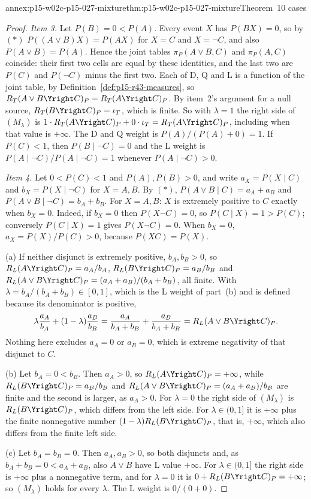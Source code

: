 \begin{annexitem}{annex:p15-w02c-p15-027-mixture}{thm:p15-w02c-p15-027-mixture}{Theorem~10 cases}
\begin{proof}
\emph{Item 3.} Let \(P(B)=0<P(A)\). Every event \(X\) has
\(P(BX)=0\), so by \((\ast)\) \(P((A\vee B)X)=P(AX)\) for \(X=C\) and
\(X=\neg C\), and also \(P(A\vee B)=P(A)\). Hence the joint tables
\(\pi_P(A\vee B,C)\) and \(\pi_P(A,C)\) coincide: their first two cells
are equal by these identities, and the last two are \(P(C)\) and
\(P(\neg C)\) minus the first two. Each of D, Q and L is a function of
the joint table, by Definition~\ref{def:p15-r43-measures}, so
\(R_T(A\vee B\Yright C)_P=R_T(A\Yright C)_P\). By item~2's argument for a
null source, \(R_T(B\Yright C)_P=\iota_T\), which is finite. So with
\(\lambda=1\) the right side of \((M_\lambda)\) is
\(1\cdot R_T(A\Yright C)_P+0\cdot\iota_T=R_T(A\Yright C)_P\), including
when that value is \(+\infty\). The D and Q weight is
\(P(A)/(P(A)+0)=1\). If \(P(C)<1\), then \(P(B\mid\neg C)=0\) and the L
weight is \(P(A\mid\neg C)/P(A\mid\neg C)=1\) whenever
\(P(A\mid\neg C)>0\).

\emph{Item 4.} Let \(0<P(C)<1\) and \(P(A),P(B)>0\), and write
\(a_X=P(X\mid C)\) and \(b_X=P(X\mid\neg C)\) for \(X=A,B\). By
\((\ast)\), \(P(A\vee B\mid C)=a_A+a_B\) and
\(P(A\vee B\mid\neg C)=b_A+b_B\). For \(X=A,B\): \(X\) is extremely
positive to \(C\) exactly when \(b_X=0\). Indeed, if \(b_X=0\) then
\(P(X\neg C)=0\), so \(P(C\mid X)=1>P(C)\); conversely
\(P(C\mid X)=1\) gives \(P(X\neg C)=0\). When \(b_X=0\),
\(a_X=P(X)/P(C)>0\), because \(P(XC)=P(X)\).

(a) If neither disjunct is extremely positive, \(b_A,b_B>0\), so
\(R_L(A\Yright C)_P=a_A/b_A\), \(R_L(B\Yright C)_P=a_B/b_B\) and
\(R_L(A\vee B\Yright C)_P=(a_A+a_B)/(b_A+b_B)\), all finite. With
\(\lambda=b_A/(b_A+b_B)\in[0,1]\), which is the L weight of part~(b) and
is defined because its denominator is positive,
\[
 \lambda\frac{a_A}{b_A}+(1-\lambda)\frac{a_B}{b_B}
  =\frac{a_A}{b_A+b_B}+\frac{a_B}{b_A+b_B}
  =R_L(A\vee B\Yright C)_P.
\]
Nothing here excludes \(a_A=0\) or \(a_B=0\), which is extreme negativity
of that disjunct to \(C\).

(b) Let \(b_A=0<b_B\). Then \(a_A>0\), so \(R_L(A\Yright C)_P=+\infty\),
while \(R_L(B\Yright C)_P=a_B/b_B\) and
\(R_L(A\vee B\Yright C)_P=(a_A+a_B)/b_B\) are finite and the second is
larger, as \(a_A>0\). For \(\lambda=0\) the right side of
\((M_\lambda)\) is \(R_L(B\Yright C)_P\), which differs from the left
side. For \(\lambda\in(0,1]\) it is \(+\infty\) plus the finite
nonnegative number \((1-\lambda)R_L(B\Yright C)_P\), that is,
\(+\infty\), which also differs from the finite left side.

(c) Let \(b_A=b_B=0\). Then \(a_A,a_B>0\), so both disjuncts and, as
\(b_A+b_B=0<a_A+a_B\), also \(A\vee B\) have L value \(+\infty\). For
\(\lambda\in(0,1]\) the right side is \(+\infty\) plus a nonnegative
term, and for \(\lambda=0\) it is \(0+R_L(B\Yright C)_P=+\infty\); so
\((M_\lambda)\) holds for every \(\lambda\). The L weight is
\(0/(0+0)\).
\end{proof}
\end{annexitem}

